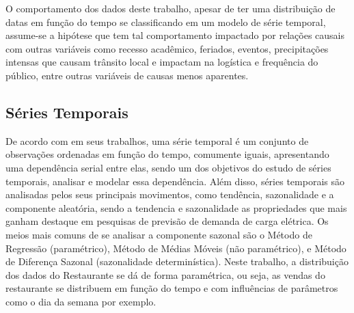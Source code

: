 \documentclass[	12pt, Times, openright, twoside, a4paper, english, brazil]{abntex2}
\begin{document}
          O comportamento dos dados deste trabalho, apesar de ter uma distribuição de datas em função do tempo se classificando em um modelo de série temporal, assume-se a hipótese que tem tal comportamento impactado por relações causais com outras variáveis como recesso acadêmico, feriados, eventos, precipitações intensas que causam trânsito local e impactam na logística e frequência do público, entre outras variáveis de causas menos aparentes.

          \begin{figure}[H]
          \end{figure}

        \subsection{Séries Temporais}
          De acordo com  \cite{Morettin1987} em seus trabalhos, uma série temporal é um conjunto de observações ordenadas em função do tempo, comumente iguais, apresentando uma dependência serial entre elas, sendo um dos objetivos do estudo de séries temporais, analisar e modelar essa dependência. Além disso, séries temporais são analisadas pelos seus principais movimentos, como tendência, sazonalidade e a componente aleatória, sendo a tendencia e sazonalidade as propriedades que mais ganham destaque em pesquisas de previsão de demanda de carga elétrica. Os meios mais comuns de se analisar a componente sazonal são o Método de Regressão (paramétrico), Método de Médias Móveis (não paramétrico), e Método de Diferença Sazonal (sazonalidade determinística).  Neste trabalho, a distribuição dos dados do Restaurante se dá de forma paramétrica, ou seja, as vendas do restaurante se distribuem em função do tempo e com influências de parâmetros como o dia da semana por exemplo. 
\end{document}
